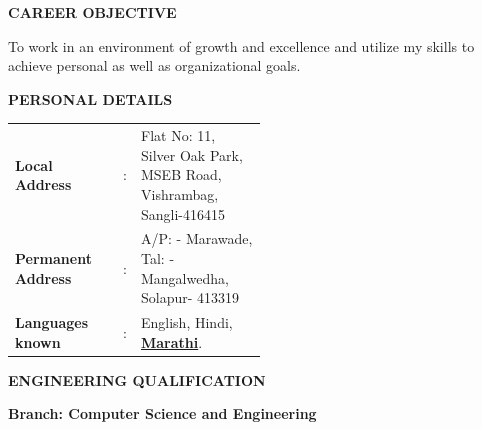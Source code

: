 \documentclass{article}
\makeatletter
\newcommand{\specialcell}[2][c]{%
  \begin{tabular}[#1]{@{}c@{}}#2\end{tabular}}
\makeatother
\begin{document}
\begin{framed}
	\large{\textbf{CAREER OBJECTIVE}}
\end{framed}
	\large{\textup{To work in an environment of growth and excellence and utilize my skills to achieve personal as well as organizational goals.}}


\begin{framed}
	\large{\textbf{PERSONAL DETAILS}}
\end{framed}
\begin{tabular}{lcm{0.5\linewidth}}
	\textbf{Local Address} & : & Flat No: 11, Silver Oak Park, MSEB Road, Vishrambag, Sangli-416415\\
	\textbf{Permanent Address} & : & A/P: - Marawade, Tal: - Mangalwedha, Solapur- 413319\\
	\textbf{Languages known} & : &  English, Hindi, \underline{\textbf{Marathi}}.
\end{tabular}


\begin{framed}
	\large{\textbf{ENGINEERING QUALIFICATION}}
\end{framed}
\large{\textbf{Branch: Computer Science and Engineering}}

\end{document}
